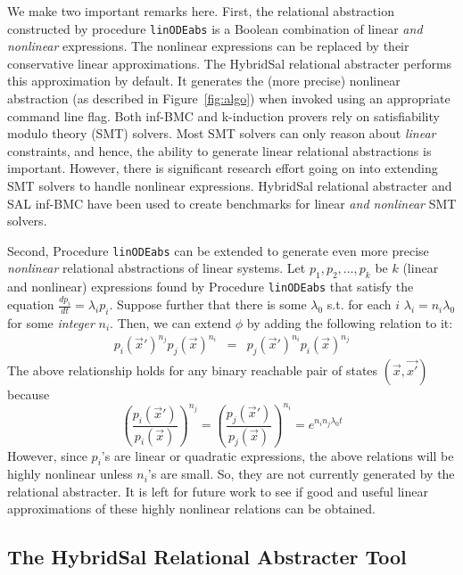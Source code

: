 \documentclass{llncs}
\def\linODEabs{\tt{linODEabs}}
\newcommand\ignore[1]{{}}
\begin{document}
We make two important remarks here.
First,
the relational abstraction constructed by 
procedure {\linODEabs} is a Boolean combination
of linear {\em{and nonlinear}} expressions.
The nonlinear expressions can be replaced by their
conservative linear approximations.  The
HybridSal relational abstracter performs this approximation
by default.  It generates the (more precise)
nonlinear abstraction (as described in Figure~\ref{fig:algo})
when invoked using an appropriate command line flag.
Both inf-BMC and k-induction
provers rely on satisfiability modulo theory (SMT) solvers.
Most SMT solvers can only reason %
about {\em{linear}} constraints, and hence, the ability to
generate linear relational abstractions is important.
However, there is significant research effort going on
into extending SMT solvers to handle nonlinear expressions.
HybridSal relational abstracter and SAL inf-BMC 
have been used to create benchmarks for 
linear {\em{and nonlinear}} SMT solvers.

Second, Procedure {\linODEabs} can be extended to
generate even more precise {\em{nonlinear}}
relational abstractions of linear systems.
Let $p_1, p_2, \ldots, p_k$ be $k$ (linear and nonlinear)
expressions found by Procedure {\linODEabs} that 
satisfy the equation $\frac{dp_i}{dt} = \lambda_i p_i$.
Suppose further that 
there is some $\lambda_0$ s.t.
for each $i$
$\lambda_i = n_i \lambda_0$ for some {\em{integer}} $n_i$.
Then, we can extend $\phi$ by adding the following relation to it:
\begin{eqnarray}
 p_i(\vec{x}')^{n_j} p_j(\vec{x})^{n_i}
 & = & p_j(\vec{x}')^{n_i}  p_i(\vec{x})^{n_j}
\label{eqn:nl}
\end{eqnarray}
The above relationship holds for any binary reachable
pair of states $(\vec{x},\vec{x'})$ 
because
$$
 \left(\frac{p_i(\vec{x}')}{p_i(\vec{x})}\right)^{n_j} 
 = 
 \left(\frac{p_j(\vec{x}')}{p_j(\vec{x})}\right)^{n_i} 
 =
 e^{n_in_j\lambda_0 t}
$$
However, since $p_i$'s are linear or quadratic 
expressions, the above relations will be highly
nonlinear unless $n_i$'s are small.  So, they are
not currently generated by the relational abstracter.
It is left for future work to see if good and useful
linear approximations of these highly nonlinear relations
can be obtained.

\subsection{The HybridSal Relational Abstracter Tool}
\end{document}

